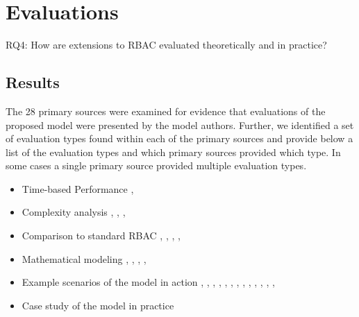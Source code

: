\section{Evaluations} \label{sec:evaluations}

RQ4: How are extensions to RBAC evaluated theoretically and in practice?

\subsection{Results}

The 28 primary sources were examined for evidence that evaluations of the proposed model were presented by the model authors.
Further, we identified a set of evaluation types found within  each of the primary sources and provide below a list of the 
evaluation types and which primary sources provided which type.  In some cases a single primary source provided multiple evaluation
types.

\begin{itemize}
\setlength{\itemsep}{0.25pt}
\item Time-based Performance \cite{ni2010privacy}, \cite{aich09:role}
\item Complexity analysis \cite{bao08:role}, \cite{zhang06:collaborative}, \cite{chen08:spatio-temporal}, \cite{aich09:role}
\item Comparison to standard RBAC \cite{bao08:role}, \cite{zou2009crbac}, \cite{zhang06:collaborative}, \cite{zhao2008flexible}, \cite{ray07:spatio}
\item Mathematical modeling \cite{damiani2007geo}, \cite{hansen2003spatial}, \cite{aich07:STARBAC}, \cite{chen08:spatio-temporal}, \cite{joshi05:generalized}
\item Example scenarios of the model in action \cite{alam06:constraint}, \cite{tzelepi01:flexible}, \cite{cholewka00:acontext-sensitive}, \cite{huang06:pervasive}, \cite{bao08:role}, \cite{jian2008extended}, \cite{yamazaki04:designing}, \cite{zou2009crbac}, \cite{ray07:spatio}, \cite{samuel07:spatio-temporal}, \cite{joshi05:generalized}, \cite{yao2008task}, \cite{zhou2007team}, \cite{oh2003task}
\item Case study of the model in practice \cite{motta03:contextual}
\end{itemize}

